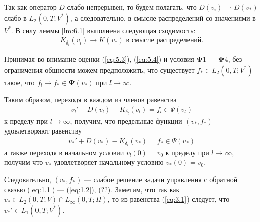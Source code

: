 \documentclass[14pt, a4paper]{extarticle}
\numberwithin{equation}{section}
\begin{document}
    Так как оператор $D$ слабо непрерывен, то будем полагать, что $D(v_i) \rightharpoonup D(v_*)$ слабо в
    $L_2(0,T;V^*)$, а следовательно, в смысле распределений со значениями в $V^*$. 
    В силу леммы \ref{lm:6.1} выполнена следующая сходимость:
    \begin{equation*}
        \begin{gathered}
            K_{\delta_l}(v_l) \rightarrow K(v_*) \textrm{ в смысле распределений}.
        \end{gathered}
    \end{equation*}

    Принимая во внимание оценки (\ref{eq:5.3}), (\ref{eq:5.4}) и условия $\boldsymbol{\Psi}1$ --- $\boldsymbol{\Psi}4$,
    без ограничения общности можем предположить, что существует $f_* \in L_2(0,T;V^*)$ такое,
    что $f_l \rightarrow f_* \in \boldsymbol{\Psi}(v_*)$ при $l \rightarrow \infty$.

    Таким образом, переходя в каждом из членов равенства
    \begin{equation*}
        \begin{gathered}
            v_l'+ D(v_l) - K_{\delta_l}(v_l) = f_l \in \Psi(v_l)
        \end{gathered}
    \end{equation*}
    \noindent к пределу при $l \rightarrow \infty$, получим, что предельные функции $(v_*,f_*)$ удовлетворяют равенству
    \begin{equation*}
        \begin{gathered}
            v_*'+ D(v_*) - K_{\delta_l}(v_*) = f_* \in \Psi(v_*)
        \end{gathered}
    \end{equation*}
    \noindent а также переходя в начальном условии $v_l(0) = v_0$ к пределу при $l \rightarrow \infty$,
    получим что $v_*$ удовлетворяет начальному условию $v_*(0) = v_0$.

    Следовательно, $(v_*,f_*)$ --- слабое решение задачи управления с обратной связью
    (\ref{eq:1.1}) --- (\ref{eq:1.2}), (??). Заметим, что так как $v_* \in L_2(0,T;V) \cap L_\infty(0,T;H)$,
    то из равенства (\ref{eq:3.1}) следует, что $v_*' \in L_1(0,T;V^*)$.



\end{document}
